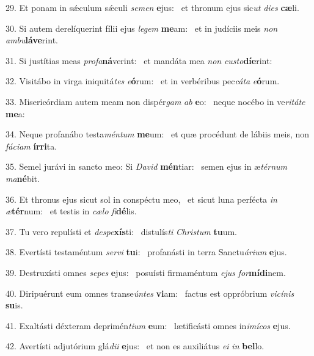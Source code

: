 29. Et ponam in sǽculum sǽculi \textit{se}\textit{men} \textbf{e}jus: \ast\  et thronum ejus sic\textit{ut} \textit{di}\textit{es} \textbf{cæ}li.\

30. Si autem derelíquerint fílii ejus \textit{le}\textit{gem} \textbf{me}am: \ast\  et in judíciis meis \textit{non} \textit{am}\textit{bu}\textbf{lá}\textbf{ve}rint.\

31. Si justítias meas \textit{pro}\textit{fa}\textbf{ná}verint: \ast\  et mandáta mea \textit{non} \textit{cus}\textit{to}\textbf{dí}\textbf{e}rint:\

32. Visitábo in virga iniquitá\textit{tes} \textit{e}\textbf{ó}rum: \ast\  et in verbéribus pec\textit{cá}\textit{ta} \textit{e}\textbf{ó}rum.\

33. Misericórdiam autem meam non dispér\textit{gam} \textit{ab} \textbf{e}o: \ast\  neque nocébo in ve\textit{ri}\textit{tá}\textit{te} \textbf{me}a:\

34. Neque profanábo testa\textit{mén}\textit{tum} \textbf{me}um: \ast\  et quæ procédunt de lábiis meis, non \textit{fá}\textit{ci}\textit{am} \textbf{ír}\textbf{ri}ta.\

35. Semel jurávi in sancto meo: Si \textit{Da}\textit{vid} \textbf{mén}tiar: \ast\  semen ejus in æ\textit{tér}\textit{num} \textit{ma}\textbf{né}bit.\

36. Et thronus ejus sicut sol in conspéctu meo, \dag\  et sicut luna perfécta \textit{in} \textit{æ}\textbf{tér}num: \ast\  et testis in \textit{cæ}\textit{lo} \textit{fi}\textbf{dé}lis.\

37. Tu vero repulísti et \textit{de}\textit{spe}\textbf{xís}ti: \ast\  distulís\textit{ti} \textit{Chris}\textit{tum} \textbf{tu}um.\

38. Evertísti testaméntum \textit{ser}\textit{vi} \textbf{tu}i: \ast\  profanásti in terra Sanctu\textit{á}\textit{ri}\textit{um} \textbf{e}jus.\

39. Destruxísti omnes \textit{se}\textit{pes} \textbf{e}jus: \ast\  posuísti firmaméntum \textit{e}\textit{jus} \textit{for}\textbf{mí}\textbf{di}nem.\

40. Diripuérunt eum omnes transe\textit{ún}\textit{tes} \textbf{vi}am: \ast\  factus est oppróbrium \textit{vi}\textit{cí}\textit{nis} \textbf{su}is.\

41. Exaltásti déxteram deprimén\textit{ti}\textit{um} \textbf{e}um: \ast\  lætificásti omnes in\textit{i}\textit{mí}\textit{cos} \textbf{e}jus.\

42. Avertísti adjutórium glá\textit{di}\textit{i} \textbf{e}jus: \ast\  et non es auxiliátus \textit{e}\textit{i} \textit{in} \textbf{bel}lo.\

